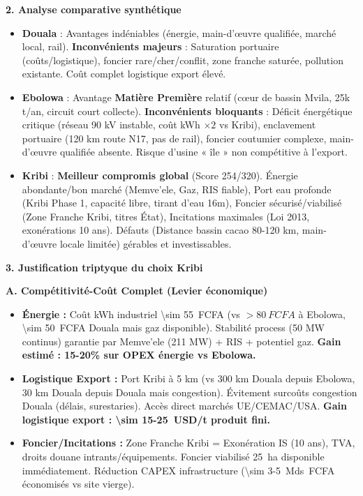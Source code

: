 \documentclass[11pt]{article}
\begin{document}
\begin{exoresolu}
\textbf{2. Analyse comparative synthétique}
\begin{itemize}
    \item \textbf{Douala} : Avantages indéniables (énergie, main-d'œuvre qualifiée, marché local, rail). \textbf{Inconvénients majeurs} : Saturation portuaire (coûts/logistique), foncier rare/cher/conflit, zone franche saturée, pollution existante. Coût complet logistique export élevé.
    \item \textbf{Ebolowa} : Avantage \textbf{Matière Première} relatif (cœur de bassin Mvila, 25k t/an, circuit court collecte). \textbf{Inconvénients bloquants} : Déficit énergétique critique (réseau 90 kV instable, coût kWh $\times 2$ vs Kribi), enclavement portuaire (120 km route N17, pas de rail), foncier coutumier complexe, main-d'œuvre qualifiée absente. Risque d'usine « île » non compétitive à l'export.
    \item \textbf{Kribi} : \textbf{Meilleur compromis global} (Score 254/320). Énergie abondante/bon marché (Memve'ele, Gaz, RIS fiable), Port eau profonde (Kribi Phase 1, capacité libre, tirant d'eau 16m), Foncier sécurisé/viabilisé (Zone Franche Kribi, titres État), Incitations maximales (Loi 2013, exonérations 10 ans). Défauts (Distance bassin cacao 80-120 km, main-d'œuvre locale limitée) gérables et investissables.
\end{itemize}

\textbf{3. Justification triptyque du choix Kribi}

\textbf{A. Compétitivité-Coût Complet (Levier économique)}
\begin{itemize}
    \item \textbf{Énergie :} Coût kWh industriel \SI{\sim 55}{FCFA} (vs $> \SI{80}{FCFA}$ à Ebolowa, \SI{\sim 50}{FCFA} Douala mais gaz disponible). Stabilité process (50 MW continus) garantie par Memve'ele (211 MW) + RIS + potentiel gaz. \textbf{Gain estimé : 15-20\% sur OPEX énergie vs Ebolowa.}
    \item \textbf{Logistique Export :} Port Kribi à 5 km (vs 300 km Douala depuis Ebolowa, 30 km Douala depuis Douala mais congestion). Évitement surcoûts congestion Douala (délais, surestaries). Accès direct marchés UE/CEMAC/USA. \textbf{Gain logistique export : \SI{\sim 15-25}{USD/t} produit fini.}
    \item \textbf{Foncier/Incitations :} Zone Franche Kribi = Exonération IS (10 ans), TVA, droits douane intrants/équipements. Foncier viabilisé \SI{25}{ha} disponible immédiatement. Réduction CAPEX infrastructure (\SI{\sim 3-5}{Mds FCFA} économisés vs site vierge).
\end{itemize}


\end{exoresolu}
\end{document}
